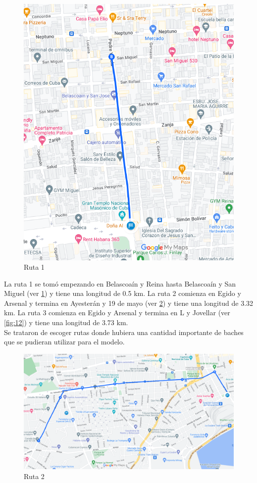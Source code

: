 	\begin{figure}[htb]
		\centering
		\includegraphics[scale = 0.5]{Graphics/route_1_BelascoainyReina_BelascoainySanMiguel.png}
		\caption{Ruta 1}
		\label{fig:10}
	\end{figure}

	La ruta 1 se tomó empezando en Belascoaín y Reina hasta Belascoaín y San Miguel (ver \ref{fig:10}) y tiene una longitud de 0.5 km. La ruta
	2 comienza en Egido y Arsenal y termina en Ayesterán y 19 de mayo (ver \ref{fig:11}) y tiene una longitud de 3.32 km. La ruta 3 comienza en
	Egido y Arsenal y termina en L y Jovellar (ver \ref{fig:12}) y tiene una longitud de 3.73 km.\\ \indent Se trataron de escoger rutas donde
	hubiera una cantidad importante de baches que se pudieran utilizar para el modelo.
	\newpage

	\begin{figure}[htb]
		\centering
		\includegraphics[scale = 0.4]{Graphics/route_2_EgidoArsenal_Ayesteran19deMayo.png}
		\caption{Ruta 2}
		\label{fig:11}
	\end{figure}

